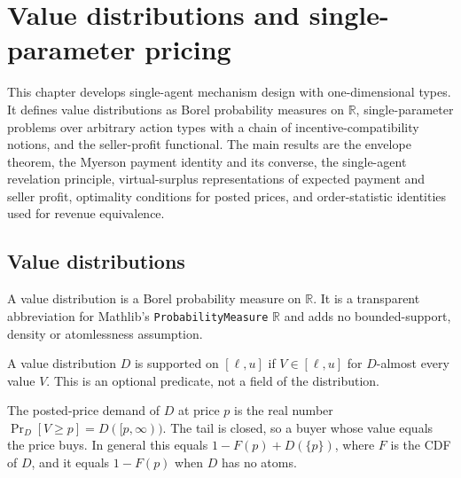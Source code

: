 \chapter{Value distributions and single-parameter pricing}

This chapter develops single-agent mechanism design with one-dimensional types. It defines value distributions as Borel probability measures on $\mathbb{R}$, single-parameter problems over arbitrary action types with a chain of incentive-compatibility notions, and the seller-profit functional. The main results are the envelope theorem, the Myerson payment identity and its converse, the single-agent revelation principle, virtual-surplus representations of expected payment and seller profit, optimality conditions for posted prices, and order-statistic identities used for revenue equivalence.

\section{Value distributions}

\begin{definition}\label{def:MathEconLib.ValueDistribution}\leanok
A value distribution is a Borel probability measure on $\mathbb{R}$. It is a transparent abbreviation for Mathlib's \texttt{ProbabilityMeasure} $\mathbb{R}$ and adds no bounded-support, density or atomlessness assumption.
\end{definition}

\begin{definition}\label{def:MathEconLib.ValueDistribution.IsSupportedOnInterval}\leanok
{}
A value distribution $D$ is supported on $[\ell,u]$ if $V\in[\ell,u]$ for $D$-almost every value $V$. This is an optional predicate, not a field of the distribution.
\end{definition}

\begin{definition}\label{def:MathEconLib.ValueDistribution.probAtLeast}\leanok
{}
The posted-price demand of $D$ at price $p$ is the real number $\Pr_D[V\ge p]=D([p,\infty))$. The tail is closed, so a buyer whose value equals the price buys. In general this equals $1-F(p)+D(\{p\})$, where $F$ is the CDF of $D$, and it equals $1-F(p)$ when $D$ has no atoms.
\end{definition}

